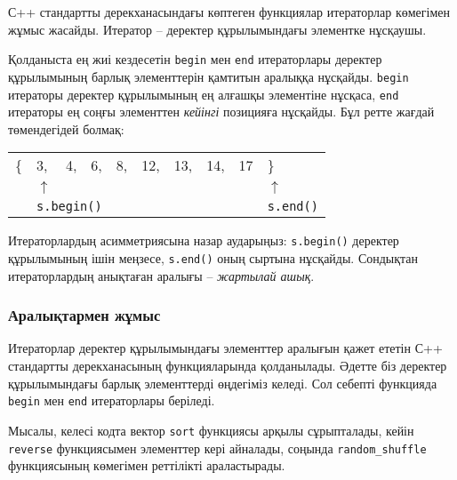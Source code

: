 С++ стандартты дерекханасындағы көптеген функциялар 
итераторлар көмегімен жұмыс жасайды.
Итератор -- деректер құрылымындағы элементке нұсқаушы.

Қолданыста ең жиі кездесетін \texttt{begin} 
мен \texttt{end} итераторлары деректер құрылымының барлық
элементтерін қамтитын аралыққа нұсқайды.
\texttt{begin} итераторы деректер құрылымының
ең алғашқы элементіне нұсқаса, 
\texttt{end} итераторы ең соңғы элементтен
\emph{кейінгі} позицияға нұсқайды.
Бұл ретте жағдай төмендегідей болмақ:

\begin{center}
\begin{tabular}{llllllllll}
\{ & 3, & 4, & 6, & 8, & 12, & 13, & 14, & 17 & \} \\
& $\uparrow$ & & & & & & & & $\uparrow$ \\
& \multicolumn{3}{l}{\texttt{s.begin()}} & & & & & & \texttt{s.end()} \\
\end{tabular}
\end{center}

Итераторлардың асимметриясына назар аударыңыз:
\texttt{s.begin()} деректер құрылымының ішін меңзесе,
\texttt{s.end()} оның сыртына нұсқайды.
Сондықтан итераторлардың анықтаған аралығы -- \emph{жартылай ашық}.

\subsubsection{Аралықтармен жұмыс}
Итераторлар деректер құрылымындағы элементтер аралығын қажет ететін
С++ стандартты дерекханасының функцияларында қолданылады.
Әдетте біз деректер құрылымындағы барлық элементтерді 
өңдегіміз келеді. Сол себепті функцияда \texttt{begin} мен
\texttt{end} итераторлары беріледі.

Мысалы, келесі кодта вектор \texttt{sort} функциясы арқылы
сұрыпталады, кейін \texttt{reverse} функциясымен элементтер кері айналады, соңында \texttt{random\_shuffle} функциясының
көмегімен реттілікті араластырады.

